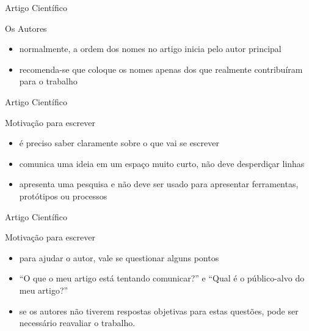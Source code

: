 \begin{frame}{Artigo Científico}
    \begin{block}{Os Autores}
        \begin{itemize}
            \item normalmente, a ordem dos nomes no artigo inicia pelo autor principal
            \item recomenda-se que coloque os nomes apenas dos que realmente contribuíram para o trabalho
        \end{itemize}
    \end{block}
\end{frame}

\begin{frame}{Artigo Científico}
    \begin{block}{Motivação para escrever}
        \begin{itemize}
            \item é preciso saber claramente sobre o que vai se escrever
            \item comunica uma ideia em um espaço muito curto, não deve desperdiçar linhas
            \item apresenta uma pesquisa e não deve ser usado para apresentar ferramentas, protótipos ou processos
        \end{itemize}
    \end{block}
\end{frame}

\begin{frame}{Artigo Científico}
    \begin{block}{Motivação para escrever}
        \begin{itemize}
            \item para ajudar o autor, vale se questionar alguns pontos
            \item ``O que o meu artigo está tentando comunicar?'' e ``Qual é o público-alvo do meu artigo?''
            \item se os autores não tiverem respostas objetivas para estas questões, pode ser necessário reavaliar o trabalho.
        \end{itemize}
    \end{block}
\end{frame}

